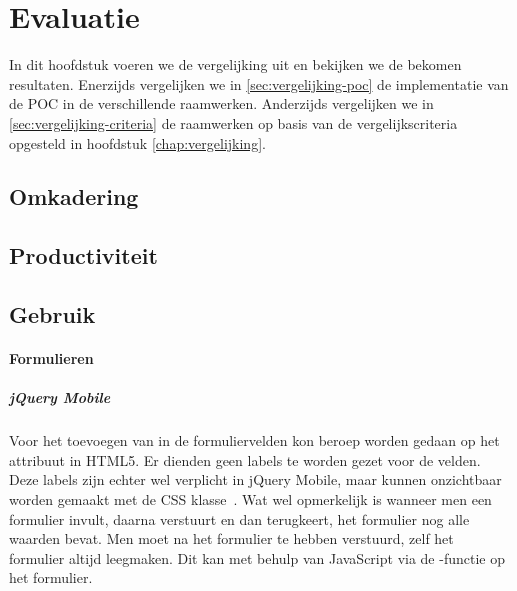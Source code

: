 \chapter{Evaluatie}
\label{chap:evaluatie}

In dit hoofdstuk voeren we de vergelijking uit en bekijken we de bekomen resultaten.
Enerzijds vergelijken we in \ref{sec:vergelijking-poc} de implementatie van de POC in de verschillende raamwerken.
Anderzijds vergelijken we in \ref{sec:vergelijking-criteria} de raamwerken op basis van de vergelijkscriteria opgesteld in hoofdstuk \ref{chap:vergelijking}.


\section{Omkadering}
\section{Productiviteit}
\section{Gebruik}

\subsubsection{Formulieren}

\paragraph{jQuery Mobile} 
Voor het toevoegen van  in de formuliervelden kon beroep worden gedaan op het  attribuut in HTML5. 
Er dienden geen labels te worden gezet voor de velden. 
Deze labels zijn echter wel verplicht in jQuery Mobile, maar kunnen onzichtbaar worden gemaakt met de  CSS klasse~\cite{JQuery2013}. 
Wat wel opmerkelijk is wanneer men een formulier invult, daarna verstuurt en dan terugkeert, het formulier nog alle waarden bevat. 
Men moet na het formulier te hebben verstuurd, zelf het formulier altijd leegmaken. 
Dit kan met behulp van JavaScript via de -functie op het formulier.

